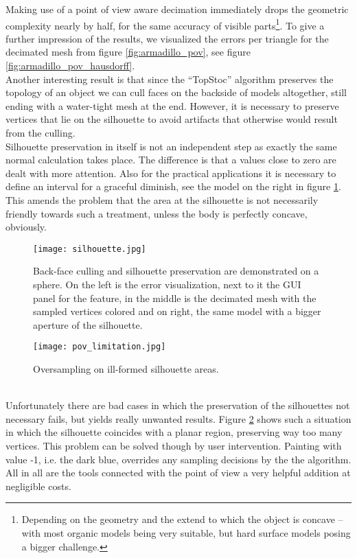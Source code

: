 Making use of a point of view aware decimation immediately drops the geometric complexity nearly by half, for the same accuracy of visible parts\footnote{ Depending on the geometry and the extend to which the object is concave -- with most organic models being very suitable, but hard surface models posing a bigger challenge.}.
To give a further impression of the results, we visualized the errors per triangle for the decimated mesh from figure \ref{fig:armadillo_pov}, see figure \ref{fig:armadillo_pov_hausdorff}.\\
Another interesting result is that since the ``TopStoc'' algorithm preserves the topology of an object we can cull faces on the backside of models altogether, still ending with a water-tight mesh at the end.
However, it is necessary to preserve vertices that lie on the silhouette to avoid artifacts that otherwise would result from the culling.\\
Silhouette preservation in itself is not an independent step as exactly the same normal calculation takes place.
The difference is that a values close to zero are dealt with more attention. 
Also for the practical applications it is necessary to define an interval for a graceful diminish, see the model on the right in figure \ref{fig:silhouette}.
This amends the problem that the area at the silhouette is not necessarily friendly towards such a treatment, unless the body is perfectly concave, obviously. 
\begin{figure}[ht]
\centering
\texttt{[image: silhouette.jpg]}
\caption{Back-face culling and silhouette preservation are demonstrated on a sphere. On the left is the error visualization, next to it the GUI panel for the feature, in the middle is the decimated mesh with the sampled vertices colored and on right, the same model with a bigger aperture of the silhouette.}
\label{fig:silhouette}
\end{figure}
\begin{figure}[ht]
\center
\texttt{[image: pov\_limitation.jpg]}
\caption{Oversampling on ill-formed silhouette areas.}
\label{fig:pov_limitation}
\end{figure}\\
Unfortunately there are bad cases in which the preservation of the silhouettes not necessary fails, but yields really unwanted results.
Figure \ref{fig:pov_limitation} shows such a situation in which the silhouette coincides with a planar region, preserving way too many vertices.
This problem can be solved though by user intervention.
Painting with value -1, i.e. the dark blue, overrides any sampling decisions by the the algorithm.
All in all are the tools connected with the point of view a very helpful addition at negligible costs.


